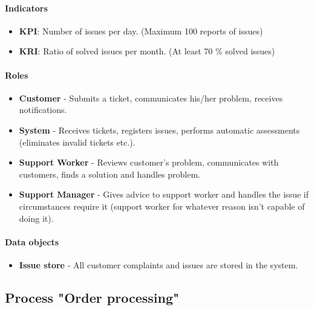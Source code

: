 \documentclass[11pt,a4paper]{article}
\begin{document}
\paragraph{Indicators}

\begin{itemize}
    \item \textbf{KPI}: Number of issues per day. (Maximum 100 reports of issues)
    \item \textbf{KRI}: Ratio of solved issues per month. (At least 70 \% solved issues)
\end{itemize}

\paragraph{Roles}

\begin{itemize}
    \item \textbf{Customer} - Submits a ticket, communicates his/her problem, receives notifications.
    \item \textbf{System} - Receives tickets, registers issues, performs automatic assessments (eliminates invalid tickets etc.).
    \item \textbf{Support Worker} - Reviews customer's problem, communicates with customers, finds a solution and handles problem.
    \item \textbf{Support Manager} - Gives advice to support worker and handles the issue if circumstances require it (support worker for whatever reason isn't capable of doing it).
\end{itemize}

\paragraph{Data objects}

\begin{itemize}
    \item \textbf{Issue store} - All customer complaints and issues are stored in the system.
\end{itemize}

\newpage




\subsection{Process "Order processing"}
\end{document}
